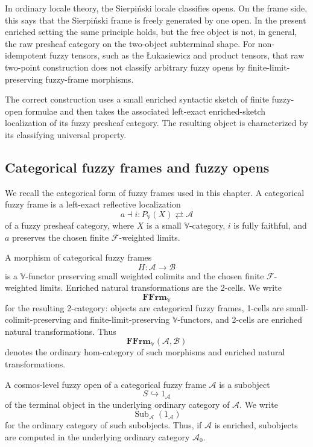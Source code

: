 In ordinary locale theory, the Sierpiński locale classifies opens. On the frame
side, this says that the Sierpiński frame is freely generated by one open. In the
present enriched setting the same principle holds, but the free object is not, in
general, the raw presheaf category on the two-object subterminal shape. For
non-idempotent fuzzy tensors, such as the {\L}ukasiewicz and product tensors, that
raw two-point construction does not classify arbitrary fuzzy opens by
finite-limit-preserving fuzzy-frame morphisms.

The correct construction uses a small enriched syntactic sketch of finite fuzzy-open
formulae and then takes the associated left-exact enriched-sketch localization of its
fuzzy presheaf category. The resulting object is characterized by its classifying
universal property.

\subsection{Categorical fuzzy frames and fuzzy opens}
\label{subsec:categorical-fuzzy-frames-and-fuzzy-opens}

We recall the categorical form of fuzzy frames used in this chapter. A categorical
fuzzy frame is a left-exact reflective localization
\[
    a\dashv i:
    P_{\mathbb V}(X)
    \rightleftarrows
    \mathcal A
\]
of a fuzzy presheaf category, where \(X\) is a small \(\mathbb V\)-category,
\(i\) is fully faithful, and \(a\) preserves the chosen finite
\(\mathcal F\)-weighted limits.

A morphism of categorical fuzzy frames
\[
    H:\mathcal A\to\mathcal B
\]
is a \(\mathbb V\)-functor preserving small weighted colimits and the chosen finite
\(\mathcal F\)-weighted limits. Enriched natural transformations are the 2-cells.
We write
\[
    \mathbf{FFrm}_{\mathbb V}
\]
for the resulting 2-category: objects are categorical fuzzy frames, 1-cells are
small-colimit-preserving and finite-limit-preserving \(\mathbb V\)-functors, and
2-cells are enriched natural transformations. Thus
\[
    \mathbf{FFrm}_{\mathbb V}(\mathcal A,\mathcal B)
\]
denotes the ordinary hom-category of such morphisms and enriched natural
transformations.

A cosmos-level fuzzy open of a categorical fuzzy frame \(\mathcal A\) is a subobject
\[
    S\hookrightarrow 1_{\mathcal A}
\]
of the terminal object in the underlying ordinary category of \(\mathcal A\). We
write
\[
    \operatorname{Sub}_{\mathcal A}(1_{\mathcal A})
\]
for the ordinary category of such subobjects. Thus, if \(\mathcal A\) is enriched,
subobjects are computed in the underlying ordinary category \(\mathcal A_0\).


